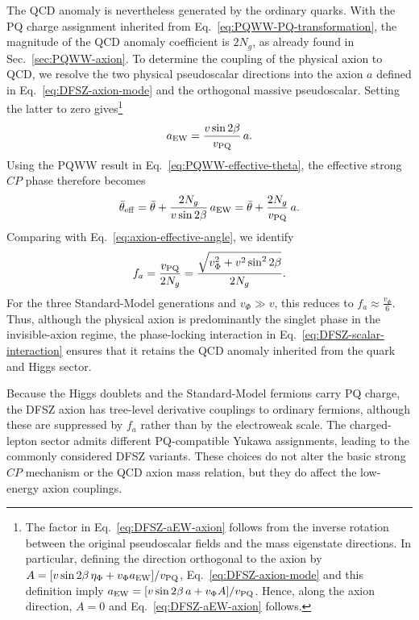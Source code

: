 \documentclass[review]{elsarticle}
\numberwithin{equation}{section}
\numberwithin{table}{section}
\numberwithin{figure}{section}
\begin{document}
The QCD anomaly is nevertheless generated by the ordinary quarks. With the PQ charge assignment inherited from Eq.~\eqref{eq:PQWW-PQ-transformation}, the magnitude of the QCD anomaly coefficient is $2N_g$, as already found in Sec.~\ref{sec:PQWW-axion}. To determine the coupling of the physical axion to QCD, we resolve the two physical pseudoscalar directions into the axion $a$ defined in Eq.~\eqref{eq:DFSZ-axion-mode} and the orthogonal massive pseudoscalar. Setting the latter to zero gives\footnote{The factor in Eq.~\eqref{eq:DFSZ-aEW-axion} follows from the inverse rotation between the original pseudoscalar fields and the mass eigenstate directions. In particular, defining the direction orthogonal to the axion by
$A=[v\sin2\beta\,\eta_\Phi+v_\Phi a_{\rm EW}]/v_{\rm PQ}$, Eq.~\eqref{eq:DFSZ-axion-mode} and this definition imply
$a_{\rm EW}=[v\sin2\beta\,a+v_\Phi A]/v_{\rm PQ}$. Hence, along the axion direction, $A=0$ and Eq.~\eqref{eq:DFSZ-aEW-axion} follows. }
\begin{align}
    a_{\rm EW} = \frac{v\sin2\beta}{v_{\rm PQ}}\,a .
    \label{eq:DFSZ-aEW-axion}
\end{align}
Using the PQWW result in Eq.~\eqref{eq:PQWW-effective-theta}, the effective strong $CP$ phase therefore becomes
\begin{align}
    \bar\theta_{\rm eff} = \bar\theta + \frac{2N_g}{v\sin2\beta}\,a_{\rm EW} = \bar\theta
    + \frac{2N_g}{v_{\rm PQ}}\,a .
    \label{eq:DFSZ-effective-theta}
\end{align}
Comparing with Eq.~\eqref{eq:axion-effective-angle}, we identify
\begin{align}
    f_a = \frac{v_{\rm PQ}}{2N_g} = \frac{\sqrt{v_\Phi^2+v^2\sin^22\beta}}{2N_g} .
    \label{eq:DFSZ-fa}
\end{align}
For the three Standard-Model generations and $v_\Phi\gg v$, this reduces to $f_a\approx \frac{v_\Phi}{6}$. Thus, although the physical axion is predominantly the singlet phase in the invisible-axion regime, the phase-locking interaction in Eq.~\eqref{eq:DFSZ-scalar-interaction} ensures that it retains the QCD anomaly inherited from the quark and Higgs sector. 

Because the Higgs doublets and the Standard-Model fermions carry PQ charge, the DFSZ axion has tree-level derivative couplings to ordinary fermions, although these are suppressed by $f_a$ rather than by the electroweak scale. The charged-lepton sector admits different PQ-compatible Yukawa assignments, leading to the commonly considered DFSZ variants. These choices do not alter the basic strong $CP$ mechanism or the QCD axion mass relation, but they do affect the low-energy axion couplings.
\end{document}
